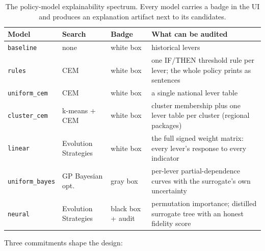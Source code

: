 \documentclass[11pt,a4paper]{article}
\newcommand{\code}[1]{\texttt{#1}}
\begin{document}
\begin{table}[ht]
\centering
\small
\begin{tabular}{@{}lllL{6.2cm}@{}}
\toprule
\textbf{Model} & \textbf{Search} & \textbf{Badge} & \textbf{What can be audited} \\
\midrule
\code{baseline} & none & white box & historical levers \\
\code{rules} & CEM & white box & one IF/THEN threshold rule per lever; the whole policy prints as sentences \\
\code{uniform\_cem} & CEM & white box & a single national lever table \\
\code{cluster\_cem} & k-means + CEM & white box & cluster membership plus one lever table per cluster (regional packages) \\
\code{linear} & Evolution Strategies & white box & the full signed weight matrix: every lever's response to every indicator \\
\code{uniform\_bayes} & GP Bayesian opt. & gray box & per-lever partial-dependence curves with the surrogate's own uncertainty \\
\code{neural} & Evolution Strategies & black box + audit & permutation importance; distilled surrogate tree with an honest fidelity score \\
\bottomrule
\end{tabular}
\caption{The policy-model explainability spectrum. Every model carries a badge
in the UI and produces an explanation artifact next to its candidates.}
\label{tab:spectrum}
\end{table}

Three commitments shape the design:
\end{document}
